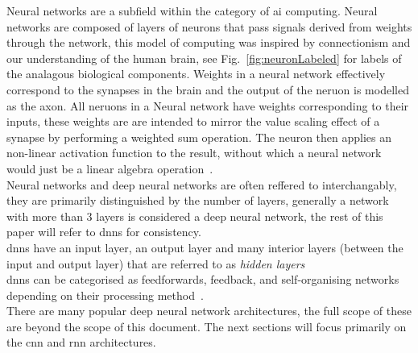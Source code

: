 \documentclass[11pt]{article}
\begin{document}
Neural networks are a subfield within the category of \Acrlong{ai} computing. Neural networks are composed of layers of neurons that pass signals derived from weights through the network, this model of computing was inspired by connectionism and our understanding of the human brain, see Fig.~\ref{fig:neuronLabeled} for labels of the analagous biological components. Weights in a neural network effectively correspond to the synapses in the brain and the output of the neruon is modelled as the axon. All neruons in a Neural network have weights corresponding to their inputs, these weights are are intended to mirror the value scaling effect of a synapse by performing a weighted sum operation. The neuron then applies an non-linear activation function to the result, without which a neural network would just be a linear algebra operation~\autocite{szeEfficientProcessingDeep2017}.\\
Neural networks and deep neural networks are often reffered to interchangably, they are primarily distinguished by the number of layers, generally a network with more than 3 layers is considered a deep neural network, the rest of this paper will refer to \acrshort{dnn}s for consistency.\\
\acrshort{dnn}s have an input layer, an output layer and many interior layers (between the input and output layer) that are referred to as \emph{hidden layers} \\
\Acrshort{dnn}s can be categorised as feedforwards, feedback, and self-organising networks depending on their processing method~\autocite{chenDeepLearningMobile2020}.\\

There are many popular deep neural network architectures, the full scope of these are beyond the scope of this document. The next sections will focus primarily on the \Acrshort{cnn} and \Acrshort{rnn} architectures.
\end{document}
